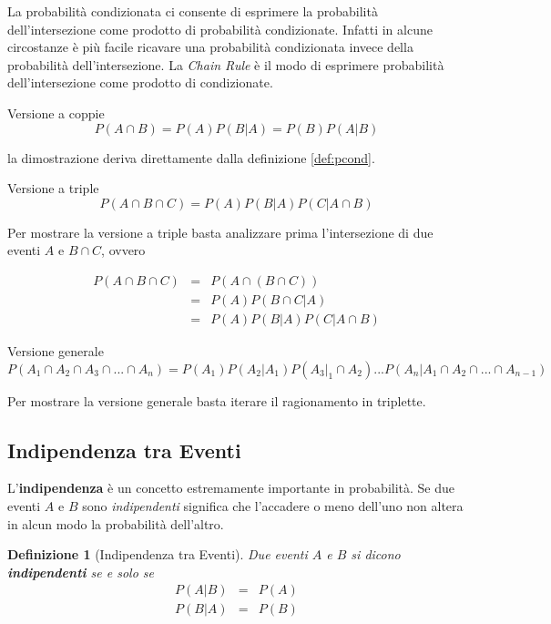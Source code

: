 \documentclass[
  11pt,
]{book}
\theoremstyle{mytheoremstyle}
\theoremstyle{mydefstyle}
\newtheorem{definition}{Definizione}[section]
\begin{document}
La probabilità condizionata ci consente di esprimere la probabilità
dell'intersezione come prodotto di probabilità condizionate. Infatti in
alcune circostanze è più facile ricavare una probabilità condizionata
invece della probabilità dell'intersezione. La \emph{Chain Rule} è il modo di
esprimere probabilità dell'intersezione come prodotto di condizionate.

Versione a coppie \[P(A\cap B)=P(A)P(B|A)=P(B)P(A|B)\]

la dimostrazione deriva direttamente dalla definizione \ref{def:pcond}.

Versione a triple \[P(A\cap B\cap C)=P(A)P(B|A)P(C|A\cap B)\]

Per mostrare la versione a triple basta analizzare prima l'intersezione
di due eventi \(A\) e \(B\cap C\), ovvero

\begin{eqnarray*}
   P(A\cap B\cap C)&=&  P(A\cap (B\cap C))\\
   &=&  P(A)P(B\cap C|A)\\
   &=&  P(A)P(B|A)P(C|A\cap B)
\end{eqnarray*}

Versione generale
\[P(A_1\cap A_2\cap A_3 \cap...\cap A_n)=P(A_1)P(A_2|A_1)P(A_3|_1\cap A_2)...P(A_{n}|A_1\cap A_2\cap ...\cap A_{n-1})\]

Per mostrare la versione generale basta iterare il ragionamento in
triplette.

\subsection{Indipendenza tra Eventi}\label{indipendenza-tra-eventi}

L'\textbf{indipendenza} è un concetto estremamente importante in probabilità.
Se due eventi \(A\) e \(B\) sono \emph{indipendenti} significa che l'accadere o
meno dell'uno non altera in alcun modo la probabilità dell'altro.

\begin{info}

\begin{definition}[Indipendenza tra Eventi]
Due eventi \(A\) e \(B\) si dicono \textbf{indipendenti} se e solo se
\begin{eqnarray*}
P(A|B)&=&P(A)\\
P(B|A)&=&P(B)
\end{eqnarray*}
\end{definition}

\end{info}
\end{document}
